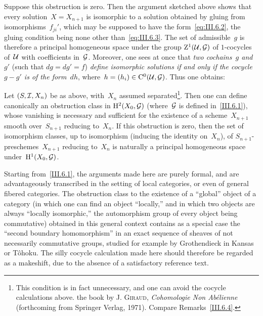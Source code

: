 Suppose this obstruction is zero. Then the argument sketched above shows that every solution~$X=X_{n+1}$ is isomorphic to a solution obtained by gluing from isomorphisms~$f_{ji}'$, which may be supposed to have the form~\eqref{eq:III.6.2}, the gluing condition being none other than~\eqref{eq:III.6.3}. The set of admissible~$g$ is therefore a principal homogeneous space under the group $\mathrm{Z}^1(\cal{U},\cal{G})$ of $1$-cocycles of~$\cal{U}$ with coefficients in~$\cal{G}$. Moreover, one sees at once that \emph{two cochains~$g$ and~$g'$} (such that $dg=dg'=f$) \emph{define isomorphic solutions if and only if the cocycle~$g-g'$ is of the form~$dh$}, where~$h=(h_i)\in\mathrm{C}^0(\cal{U},\cal{G})$. Thus one obtains:

\begin{theorem}
\label{III.6.3}
Let $(S,\cal{I},X_n)$ be as above, with~$X_n$ assumed separated\footnote{This condition is in fact unnecessary, and one can avoid the cocycle calculations above. \Cf the book by J. \textsc{Giraud}, \emph{Cohomologie Non Abélienne} (forthcoming from Springer Verlag, 1971). Compare Remarks~\ref{III.6.4}.}. Then one can define canonically an obstruction class in
$\H^2(X_0,\cal{G})$ (where~$\cal{G}$ is defined in~\ref{III.6.1}), whose vanishing is necessary and sufficient for the existence of a scheme~$X_{n+1}$ smooth over~$S_{n+1}$ reducing to~$X_n$. If this obstruction is zero, then the set of isomorphism classes, up to isomorphism (inducing the identity on~$X_n$), of $S_{n+1}$-preschemes~$X_{n+1}$ reducing to~$X_n$ is naturally a principal homogeneous space under~$\H^1(X_0,\cal{G})$.
\end{theorem}

\begin{remarks}
\label{III.6.4}
Starting from~\ref{III.6.1}, the arguments made here are purely formal, and are advantageously transcribed in the setting of local categories, or even of general fibered categories. The obstruction class to the existence of a ``global'' object of a category (in which one can find an object ``locally,'' and in which two objects are always ``locally isomorphic,'' the automorphism group of every object being commutative) obtained in this general context contains as a special case the ``second boundary homomorphism'' in an exact sequence of sheaves of not necessarily commutative groups, studied for example by Grothendieck in Kansas or T\^ohoku. The silly cocycle calculation made here should therefore be regarded as a makeshift, due to the absence of a satisfactory reference text.
\end{remarks}

